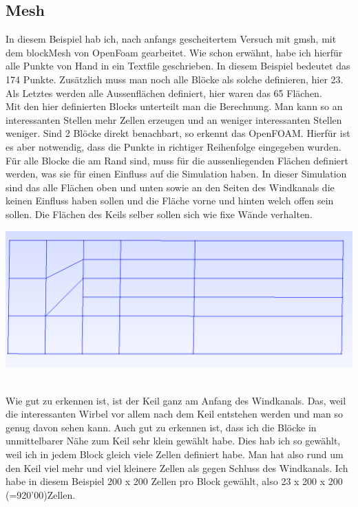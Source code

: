 \begin{refsection}
\subsection{Mesh}
In diesem Beispiel hab ich, nach anfangs gescheitertem Versuch mit gmsh, mit dem blockMesh von OpenFoam gearbeitet. Wie schon erwähnt, habe ich hierfür alle Punkte von Hand in ein Textfile geschrieben. In diesem Beispiel bedeutet das 174 Punkte. Zusätzlich muss man noch alle Blöcke als solche definieren, hier 23. Als Letztes werden alle Aussenflächen definiert, hier waren das 65 Flächen.\\
 Mit den hier definierten Blocks unterteilt man die Berechnung. Man kann so an interessanten Stellen mehr Zellen erzeugen und an weniger interessanten Stellen weniger. Sind 2 Blöcke direkt benachbart, so erkennt das OpenFOAM. Hierfür ist es aber notwendig, dass die Punkte in richtiger Reihenfolge eingegeben wurden. Für alle Blocke die am Rand sind, muss für die aussenliegenden Flächen definiert werden, was sie für einen Einfluss auf die Simulation haben. In dieser Simulation sind das alle Flächen oben und unten sowie an den Seiten des Windkanals die keinen Einfluss haben sollen und die Fläche vorne und hinten welch offen sein sollen. Die Flächen des Keils selber sollen sich wie fixe Wände verhalten. \\
\begin{minipage}{\linewidth}
\centering
\includegraphics[scale = 0.1]{./OpenFOAM/Pics/Keil.png} 
\end{minipage}
 \\
Wie gut zu erkennen ist, ist der Keil ganz am Anfang des Windkanals. Das, weil die interessanten Wirbel vor allem nach dem Keil entstehen werden und man so genug davon sehen kann. Auch gut zu erkennen ist, dass ich die Blöcke in unmittelbarer Nähe zum Keil sehr klein gewählt habe. Dies hab ich so gewählt, weil ich in jedem Block gleich viele Zellen definiert habe. Man hat also rund um den Keil viel mehr und viel kleinere Zellen als gegen Schluss des Windkanals. Ich habe in diesem Beispiel 200 x 200 Zellen pro Block gewählt, also 23 x 200 x 200 (=920'00)Zellen.

\end{refsection}
